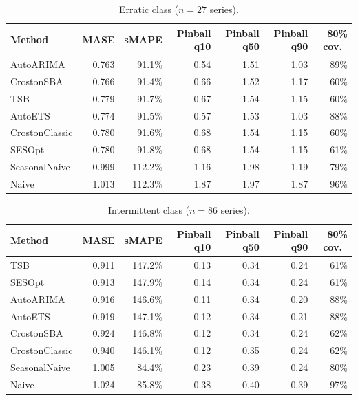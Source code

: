 \documentclass[11pt]{article}
\begin{document}
\begin{table}[htbp]
\centering\footnotesize
\begin{tabular}{lrrrrrr}
\toprule
Method & MASE & sMAPE & Pinball q10 & Pinball q50 & Pinball q90 & 80\% cov.\ \\
\midrule
AutoARIMA & 0.763 & 91.1\% & 0.54 & 1.51 & 1.03 & 89\% \\
CrostonSBA & 0.766 & 91.4\% & 0.66 & 1.52 & 1.17 & 60\% \\
TSB & 0.779 & 91.7\% & 0.67 & 1.54 & 1.15 & 60\% \\
AutoETS & 0.774 & 91.5\% & 0.57 & 1.53 & 1.03 & 88\% \\
CrostonClassic & 0.780 & 91.6\% & 0.68 & 1.54 & 1.15 & 60\% \\
SESOpt & 0.780 & 91.8\% & 0.68 & 1.54 & 1.15 & 61\% \\
SeasonalNaive & 0.999 & 112.2\% & 1.16 & 1.98 & 1.19 & 79\% \\
Naive & 1.013 & 112.3\% & 1.87 & 1.97 & 1.87 & 96\% \\
\bottomrule
\end{tabular}
\caption{Erratic class ($n = 27$ series).}
\label{tab:erratic}
\end{table}

\begin{table}[htbp]
\centering\footnotesize
\begin{tabular}{lrrrrrr}
\toprule
Method & MASE & sMAPE & Pinball q10 & Pinball q50 & Pinball q90 & 80\% cov.\ \\
\midrule
TSB & 0.911 & 147.2\% & 0.13 & 0.34 & 0.24 & 61\% \\
SESOpt & 0.913 & 147.9\% & 0.14 & 0.34 & 0.24 & 61\% \\
AutoARIMA & 0.916 & 146.6\% & 0.11 & 0.34 & 0.20 & 88\% \\
AutoETS & 0.919 & 147.1\% & 0.12 & 0.34 & 0.21 & 88\% \\
CrostonSBA & 0.924 & 146.8\% & 0.12 & 0.34 & 0.24 & 62\% \\
CrostonClassic & 0.940 & 146.1\% & 0.12 & 0.35 & 0.24 & 62\% \\
SeasonalNaive & 1.005 & 84.4\% & 0.23 & 0.39 & 0.24 & 80\% \\
Naive & 1.024 & 85.8\% & 0.38 & 0.40 & 0.39 & 97\% \\
\bottomrule
\end{tabular}
\caption{Intermittent class ($n = 86$ series).}
\label{tab:intermittent}
\end{table}
\end{document}
